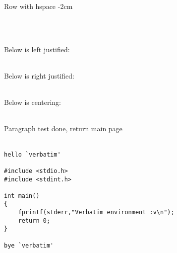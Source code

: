 \documentclass[12pt, a4paper]{report}
\begin{document}
\hspace{-2cm} Row with hspace -2cm\\

\vfill

\lipsum[2]


\newpage 

\fbox{\lipsum[1]}\\
\hbox{\lipsum[2]}\\


\newpage

\begin{flushleft}
    Below is left justified:\\
    \lipsum[1]\\
\end{flushleft}

\begin{flushright}
    Below is right justified:\\
    \lipsum[2]\\
\end{flushright}

\begin{center}
    Below is centering:\\
    \lipsum[3]\\
\end{center}

\vspace{1cm}Paragraph test done, return main page\\
\lipsum[4]\\



\begin{verbatim}
hello `verbatim'

#include <stdio.h>
#include <stdint.h>

int main()
{
    fprintf(stderr,"Verbatim environment :v\n");
    return 0;
}

bye `verbatim'
\end{verbatim}












\end{document}
